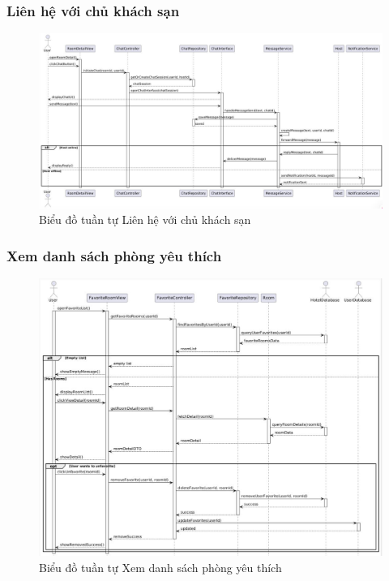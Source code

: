 \subsubsection{Liên hệ với chủ khách sạn}
\begin{figure}[H]
    \centering
    \includegraphics[width=\textwidth]{img3.4/chat3.jpg} 
    \caption{Biểu đồ tuần tự Liên hệ với chủ khách sạn}
\end{figure}

\subsubsection{Xem danh sách phòng yêu thích}
\begin{figure}[H]
    \centering
    \includegraphics[width=\textwidth]{img3.4/xemphongyeu3.jpg} 
    \caption{Biểu đồ tuần tự Xem danh sách phòng yêu thích}
\end{figure}

